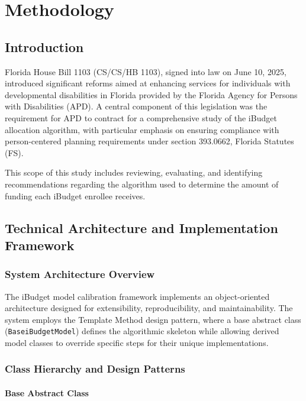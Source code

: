 \chapter{Methodology}


\section{Introduction}

Florida House Bill 1103 (CS/CS/HB 1103), signed into law on June 10, 2025, introduced significant reforms aimed at enhancing services for individuals with developmental disabilities in Florida provided by the  Florida Agency for Persons with Disabilities (APD). A central component of this legislation was the requirement for APD to contract for a comprehensive study of the iBudget allocation algorithm, with particular emphasis on ensuring compliance with person-centered planning requirements under section 393.0662, Florida Statutes (FS). 

This scope of this study includes reviewing, evaluating, and identifying recommendations regarding the algorithm used to determine the amount of funding each iBudget enrollee receives. 

\section{Technical Architecture and Implementation Framework}

\subsection{System Architecture Overview}

The iBudget model calibration framework implements an object-oriented architecture designed for extensibility, reproducibility, and maintainability. The system employs the Template Method design pattern, where a base abstract class (\texttt{BaseiBudgetModel}) defines the algorithmic skeleton while allowing derived model classes to override specific steps for their unique implementations.

\subsection{Class Hierarchy and Design Patterns}

\subsubsection{Base Abstract Class}

